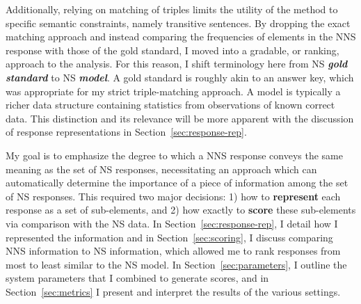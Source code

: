 Additionally, relying on matching of triples limits the utility of the method to specific semantic constraints, namely transitive sentences. By dropping the exact matching approach and instead comparing the frequencies of elements in the NNS response with those of the gold standard, I moved into a gradable, or ranking, approach to the analysis. For this reason, I shift terminology here from NS \textit{\textbf{gold standard}} to NS \textit{\textbf{model}}. A gold standard is roughly akin to an answer key, which was appropriate for my strict triple-matching approach. A model is typically a richer data structure containing statistics from observations of known correct data. This distinction and its relevance will be more apparent with the discussion of response representations in Section~\ref{sec:response-rep}.

My goal is to emphasize the degree to which a NNS response conveys the same
meaning as the set of NS responses, necessitating an approach which can automatically
determine the importance of a piece of information among the set of NS responses.  This required two major decisions: 1) how to \textbf{represent} each response as a set of sub-elements, and 2) how exactly to \textbf{score} these sub-elements via comparison with the NS data. In Section~\ref{sec:response-rep}, I detail how I represented the information and in Section~\ref{sec:scoring}, I discuss comparing NNS information to NS information, which allowed me to rank responses from most to least similar to the NS model. In Section~\ref{sec:parameters}, I outline the system parameters that I combined to generate scores, and in Section~\ref{sec:metrics} I present and interpret the results of the various settings.

%
%
